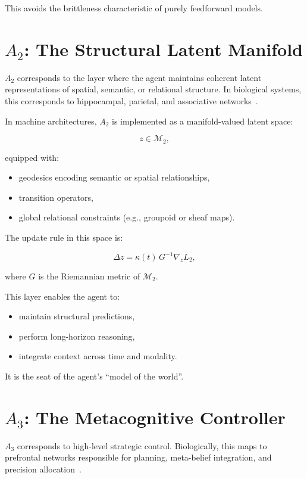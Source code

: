 \documentclass[12pt,oneside]{book}
\theoremstyle{plain}
\theoremstyle{definition}
\let\citep\parencite
\begin{document}
This avoids the brittleness characteristic of purely feedforward models.

\section{$A_2$: The Structural Latent Manifold}

$A_2$ corresponds to the layer where the agent maintains coherent latent
representations of spatial, semantic, or relational structure.
In biological systems, this corresponds to hippocampal, parietal, and associative
networks~\citep{moser2008place,constantinescu2016clo}.

In machine architectures, $A_2$ is implemented as a manifold-valued latent space:

\[
z \in \mathcal{M}_2,
\]

equipped with:

\begin{itemize}
    \item geodesics encoding semantic or spatial relationships,
    \item transition operators,
    \item global relational constraints (e.g., groupoid or sheaf maps).
\end{itemize}

The update rule in this space is:

\[
\Delta z =
\kappa(t) \, G^{-1} \nabla_z L_2,
\]

where $G$ is the Riemannian metric of $\mathcal{M}_2$.

This layer enables the agent to:

\begin{itemize}
    \item maintain structural predictions,
    \item perform long-horizon reasoning,
    \item integrate context across time and modality.
\end{itemize}

It is the seat of the agent's ``model of the world''.

\section{$A_3$: The Metacognitive Controller}

$A_3$ corresponds to high-level strategic control.
Biologically, this maps to prefrontal networks responsible for planning,
meta-belief integration, and precision allocation~\citep{solms2021hidden}.
\end{document}
